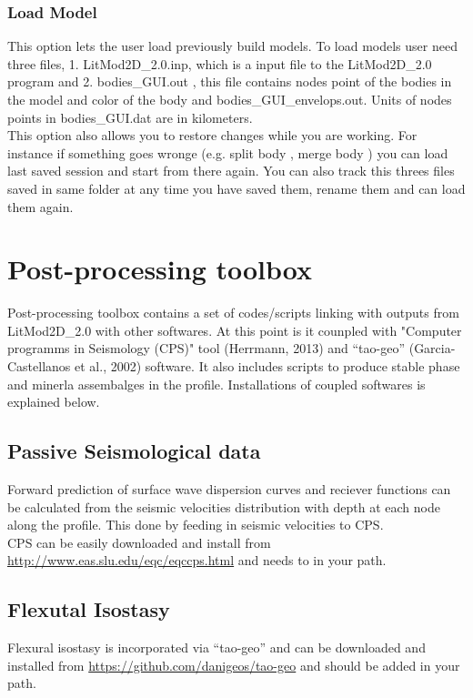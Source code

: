 \documentclass[14pt]{article}
\begin{document}
\subsubsection{Load Model}
This option lets the user load previously build models. To load models user need three files, 1. LitMod2D\_2.0.inp, which is a input file to the LitMod2D\_2.0 program and 2. bodies\_GUI.out , this file contains nodes point of the bodies in the model and color of the body and bodies\_GUI\_envelops.out. Units of nodes points in bodies\_GUI.dat are in kilometers. \\
This option also allows you to restore changes while you are working. For instance if something goes wronge (e.g. split body , merge body ) you can load last saved session and start from there again. You can also track this threes files saved in same folder at any time you have saved them, rename them and can load them again.

\section{Post-processing toolbox}
Post-processing toolbox contains a set of codes/scripts linking with outputs from LitMod2D\_2.0 with other softwares. At this point is it counpled with "Computer programms in Seismology (CPS)" tool (Herrmann, 2013) and “tao-geo” (Garcia-Castellanos et al., 2002) software. It also includes scripts to produce stable phase and minerla assembalges in the profile. Installations of coupled softwares is explained below. 
\subsection{Passive Seismological data}
Forward prediction of surface wave dispersion curves and reciever functions can be calculated from the seismic velocities distribution with depth at each node along the profile. This done by feeding in seismic velocities to CPS.\\
CPS can be easily downloaded and install from  \url{http://www.eas.slu.edu/eqc/eqccps.html} and needs to in your path.\\
\subsection{Flexutal Isostasy}
Flexural isostasy is incorporated via “tao-geo” and can be downloaded and installed from \url{https://github.com/danigeos/tao-geo} and should be added in your path. 
\end{document}
